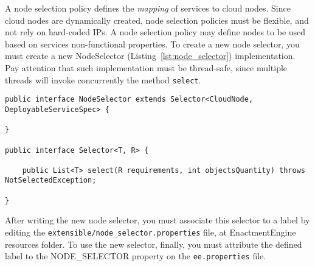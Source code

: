A node selection policy defines the \emph{mapping} of services to cloud nodes.
Since cloud nodes are dynamically created, node selection policies must be flexible, and not rely on hard-coded IPs.
A node selection policy may define nodes to be used based on services non-functional properties.
To create a new node selector, you must create a new \textsf{NodeSelector} (Listing~\ref{lst:node_selector}) implementation.
Pay attention that such implementation must be thread-safe, since multiple threads will invoke concurrently the method \texttt{select}.

{\footnotesize
\begin{lstlisting}[caption=\textsf{NodeSelector} interface., label=lst:node_selector]
public interface NodeSelector extends Selector<CloudNode, DeployableServiceSpec> {

}

public interface Selector<T, R> {

    public List<T> select(R requirements, int objectsQuantity) throws NotSelectedException;

}
\end{lstlisting}
}

After writing the new node selector, you must associate this selector to a label by editing the \texttt{extensible/node\_selector.properties} file, at EnactmentEngine resources folder.
To use the new selector, finally, you must attribute the defined label to the NODE\_SELECTOR property on the \texttt{ee.properties} file.







